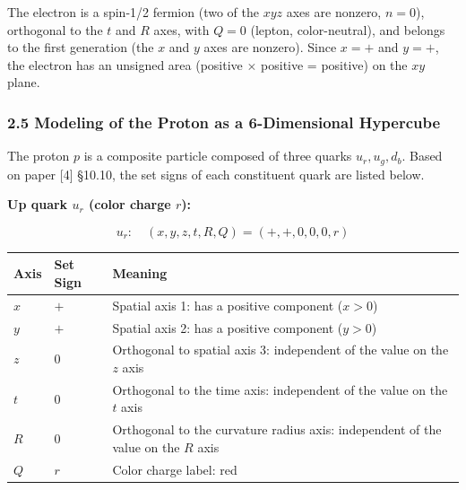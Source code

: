 \documentclass[
  a4paper,11pt]{article}
\newcounter{none}
\theoremstyle{definition}
\theoremstyle{remark}
\begin{document}
The electron is a spin-1/2 fermion (two of the \(xyz\) axes are nonzero,
\(n = 0\)), orthogonal to the \(t\) and \(R\) axes, with \(Q = 0\)
(lepton, color-neutral), and belongs to the first generation (the \(x\)
and \(y\) axes are nonzero). Since \(x = +\) and \(y = +\), the electron
has an unsigned area (positive \(\times\) positive = positive) on the
\(xy\) plane.

\subsubsection{2.5 Modeling of the Proton as a 6-Dimensional
Hypercube}\label{modeling-of-the-proton-as-a-6-dimensional-hypercube}

The proton \(p\) is a composite particle composed of three quarks
\(u_r, u_g, d_b\). Based on paper {[}4{]} §10.10, the set signs of each
constituent quark are listed below.

\textbf{Up quark \(u_r\) (color charge \(r\)):}

\[u_r: \quad (x, y, z, t, R, Q) = (+, +, 0, 0, 0, r)\]

{\def\LTcaptype{none} %
\begin{longtable}[]{@{}
  >{\centering\arraybackslash}p{}
  >{\centering\arraybackslash}p{}
  >{\raggedright\arraybackslash}p{}@{}}
\toprule\noalign{}
\begin{minipage}[b]{\linewidth}\centering
Axis
\end{minipage} & \begin{minipage}[b]{\linewidth}\centering
Set Sign
\end{minipage} & \begin{minipage}[b]{\linewidth}\raggedright
Meaning
\end{minipage} \\
\midrule\noalign{}
\endhead
\bottomrule\noalign{}
\endlastfoot
\(x\) & \(+\) & Spatial axis 1: has a positive component (\(x > 0\)) \\
\(y\) & \(+\) & Spatial axis 2: has a positive component (\(y > 0\)) \\
\(z\) & \(0\) & Orthogonal to spatial axis 3: independent of the value
on the \(z\) axis \\
\(t\) & \(0\) & Orthogonal to the time axis: independent of the value on
the \(t\) axis \\
\(R\) & \(0\) & Orthogonal to the curvature radius axis: independent of
the value on the \(R\) axis \\
\(Q\) & \(r\) & Color charge label: red \\
\end{longtable}
}
\end{document}
